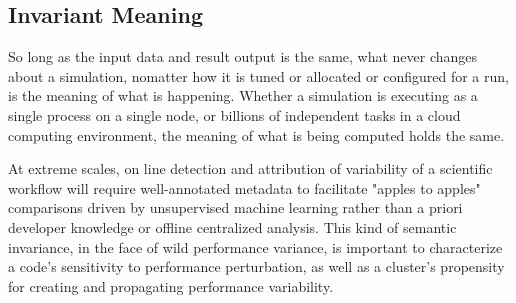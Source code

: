 
\subsection{Invariant Meaning}


So long as the input data and result output is the same, what never
changes about a simulation, nomatter how it is tuned or allocated or
configured for a run, is the meaning of what is happening.  Whether a
simulation is executing as a single process on a single node, or
billions of independent tasks in a cloud computing environment, the
meaning of what is being computed holds the same.

At extreme scales, on line detection and attribution of variability of
a scientific workflow will require well-annotated metadata to
facilitate "apples to apples" comparisons driven by unsupervised
machine learning rather than a priori developer knowledge or offline
centralized analysis. This kind of semantic invariance, in the face of
wild performance variance, is important to characterize a code's
sensitivity to performance perturbation, as well as a cluster's
propensity for creating and propagating performance variability.


